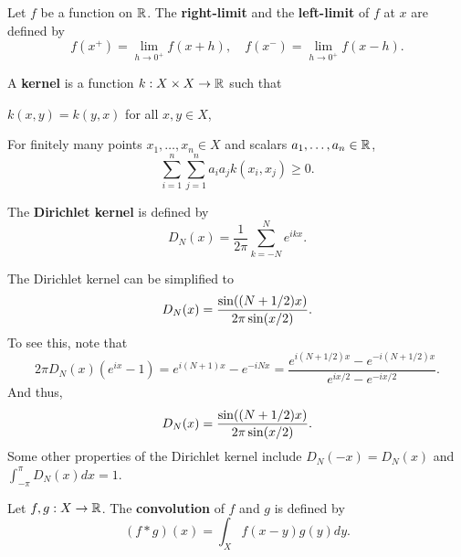 \begin{definition}
    Let $f$ be a function on $\mathbb{R}$. The \textbf{right-limit} and 
    the \textbf{left-limit} of $f$ at $x$ are defined by
    \begin{equation*}
        f(x^+) = \lim_{h\to 0^+} f(x+h), \quad f(x^-) = \lim_{h\to 0^+} f(x-h).
    \end{equation*}
\end{definition}

\begin{definition}
    A \textbf{kernel} is a function $k:X\times X\to\mathbb{R}$ such that 
    \begin{thmenum}
        \item $k(x,y) = k(y,x)$ for all $x,y\in X$,
        \item For finitely many points $x_1,\ldots,x_n\in X$ and scalars $a_1,\ldots,a_n\in\mathbb{R}$, 
        \begin{equation*}
            \sum_{i=1}^n \sum_{j=1}^n a_ia_jk(x_i,x_j) \geq 0.
        \end{equation*}
    \end{thmenum}
\end{definition}

\begin{definition}
    The \textbf{Dirichlet kernel} is defined by
    \begin{equation*}
        D_N(x) = \frac{1}{2\pi}\sum_{k=-N}^N e^{ikx}.
    \end{equation*}
\end{definition}
\begin{remark}
    The Dirichlet kernel can be simplified to 
    \begin{equation*}
        D_N(x) = \frac{\sin\pth{(N+1/2)x}}{2\pi\sin(x/2)}.
    \end{equation*}
    To see this, note that 
    \begin{equation*}
        2\pi D_N(x)(e^{ix}-1) = e^{i(N+1)x} - e^{-iNx} 
        = \frac{e^{i(N+1/2)x} - e^{-i(N+1/2)x}}{e^{ix/2} - e^{-ix/2}}.
    \end{equation*}
    And thus,
    \begin{equation*}
        D_N(x) = \frac{\sin\pth{(N+1/2)x}}{2\pi\sin(x/2)}.
    \end{equation*}
    Some other properties of the Dirichlet kernel include $D_N(-x) = D_N(x)$ 
    and $\int_{-\pi}^\pi D_N(x)dx = 1$.
\end{remark}

\begin{definition}
    Let $f,g:X\to\mathbb{R}$. The \textbf{convolution} of $f$ and $g$ is defined by
    \begin{equation*}
        (f*g)(x) = \int_X f(x-y)g(y)dy.
    \end{equation*}
\end{definition}

